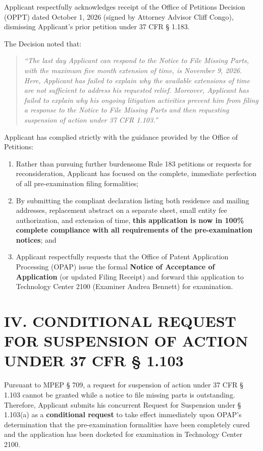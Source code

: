 \documentclass[11pt,letterpaper]{article}
\begin{document}
Applicant respectfully acknowledges receipt of the Office of Petitions Decision (OPPT) dated October 1, 2026 (signed by Attorney Advisor Cliff Congo), dismissing Applicant's prior petition under 37 CFR \S{} 1.183. 

The Decision noted that:
\begin{quote}
\textit{``The last day Applicant can respond to the Notice to File Missing Parts, with the maximum five month extension of time, is November 9, 2026. Here, Applicant has failed to explain why the available extensions of time are not sufficient to address his requested relief. Moreover, Applicant has failed to explain why his ongoing litigation activities prevent him from filing a response to the Notice to File Missing Parts and then requesting suspension of action under 37 CFR 1.103.''}
\end{quote}

Applicant has complied strictly with the guidance provided by the Office of Petitions:
\begin{enumerate}[leftmargin=2em, itemsep=2pt, parsep=0pt]
    \item Rather than pursuing further burdensome Rule 183 petitions or requests for reconsideration, Applicant has focused on the complete, immediate perfection of all pre-examination filing formalities;
    \item By submitting the compliant declaration listing both residence and mailing addresses, replacement abstract on a separate sheet, small entity fee authorization, and extension of time, \textbf{this application is now in 100\% complete compliance with all requirements of the pre-examination notices}; and
    \item Applicant respectfully requests that the Office of Patent Application Processing (OPAP) issue the formal \textbf{Notice of Acceptance of Application} (or updated Filing Receipt) and forward this application to Technology Center 2100 (Examiner Andrea Bennett) for examination.
\end{enumerate}

\section*{IV. CONDITIONAL REQUEST FOR SUSPENSION OF ACTION UNDER 37 CFR \S{} 1.103}

Pursuant to MPEP \S{} 709, a request for suspension of action under 37 CFR \S{} 1.103 cannot be granted while a notice to file missing parts is outstanding. Therefore, Applicant submits his concurrent Request for Suspension under \S{} 1.103(a) as a \textbf{conditional request} to take effect immediately upon OPAP's determination that the pre-examination formalities have been completely cured and the application has been docketed for examination in Technology Center 2100.
\end{document}
